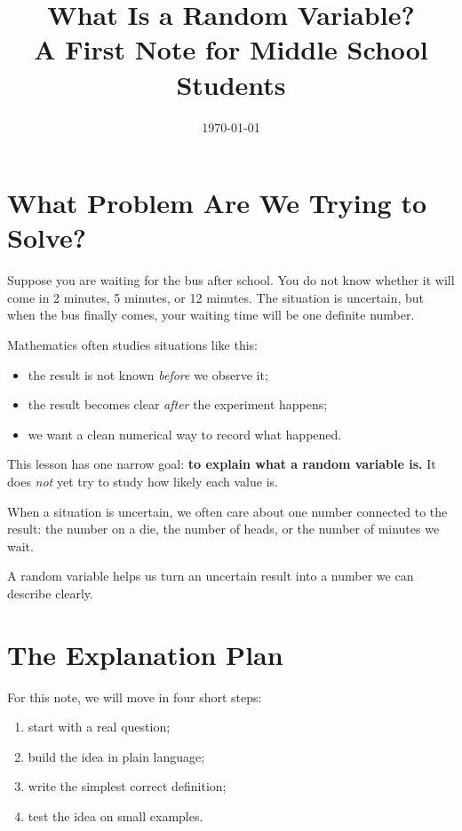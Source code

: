 \documentclass[11pt,a4paper]{article}
\title{What Is a Random Variable?\\\large A First Note for Middle School Students}
\author{}
\date{\today}
\begin{document}
\maketitle

\section{What Problem Are We Trying to Solve?}

\begin{problemblock}
Suppose you are waiting for the bus after school. You do not know whether it will come in
2 minutes, 5 minutes, or 12 minutes. The situation is uncertain, but when the bus finally
comes, your waiting time will be one definite number.
\end{problemblock}

Mathematics often studies situations like this:

\begin{itemize}
  \item the result is not known \emph{before} we observe it;
  \item the result becomes clear \emph{after} the experiment happens;
  \item we want a clean numerical way to record what happened.
\end{itemize}

This lesson has one narrow goal:
\textbf{to explain what a random variable is.}
It does \emph{not} yet try to study how likely each value is.

\begin{intuitionblock}
When a situation is uncertain, we often care about one number connected to the result:
the number on a die, the number of heads, or the number of minutes we wait.
\end{intuitionblock}

\begin{keypointblock}
A random variable helps us turn an uncertain result into a number we can describe clearly.
\end{keypointblock}

\section{The Explanation Plan}

For this note, we will move in four short steps:

\begin{enumerate}
  \item start with a real question;
  \item build the idea in plain language;
  \item write the simplest correct definition;
  \item test the idea on small examples.
\end{enumerate}
\end{document}
